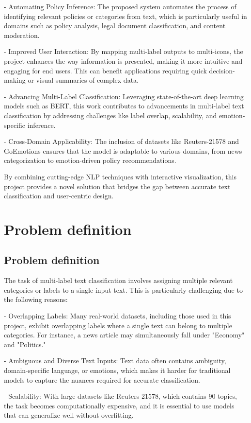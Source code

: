 \documentclass{article}
\begin{document}
- Automating Policy Inference: The proposed system automates the process of identifying relevant policies or categories from text, which is particularly useful in domains such as policy analysis, legal document classification, and content moderation.

- Improved User Interaction: By mapping multi-label outputs to multi-icons, the project enhances the way information is presented, making it more intuitive and engaging for end users. This can benefit applications requiring quick decision-making or visual summaries of complex data.

- Advancing Multi-Label Classification: Leveraging state-of-the-art deep learning models such as BERT, this work contributes to advancements in multi-label text classification by addressing challenges like label overlap, scalability, and emotion-specific inference.

- Cross-Domain Applicability: The inclusion of datasets like Reuters-21578 and GoEmotions ensures that the model is adaptable to various domains, from news categorization to emotion-driven policy recommendations.

By combining cutting-edge NLP techniques with interactive visualization, this project provides a novel solution that bridges the gap between accurate text classification and user-centric design.
\section{Problem definition}
\subsection{Problem definition}
The task of multi-label text classification involves assigning multiple relevant categories or labels to a single input text. This is particularly challenging due to the following reasons:

- Overlapping Labels: Many real-world datasets, including those used in this project, exhibit overlapping labels where a single text can belong to multiple categories. For instance, a news article may simultaneously fall under "Economy" and "Politics."

- Ambiguous and Diverse Text Inputs: Text data often contains ambiguity, domain-specific language, or emotions, which makes it harder for traditional models to capture the nuances required for accurate classification.

- Scalability: With large datasets like Reuters-21578, which contains 90 topics, the task becomes computationally expensive, and it is essential to use models that can generalize well without overfitting.
\end{document}
